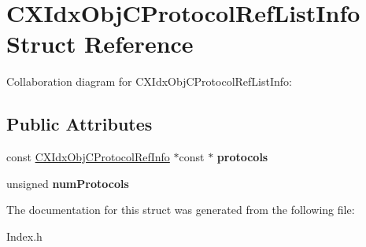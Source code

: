 \hypertarget{structCXIdxObjCProtocolRefListInfo}{}\section{C\+X\+Idx\+Obj\+C\+Protocol\+Ref\+List\+Info Struct Reference}
\label{structCXIdxObjCProtocolRefListInfo}


Collaboration diagram for C\+X\+Idx\+Obj\+C\+Protocol\+Ref\+List\+Info\+:
\subsection*{Public Attributes}
\begin{DoxyCompactItemize}
\item 
\mbox{\label{structCXIdxObjCProtocolRefListInfo_acb9f5514262e6520e041e0ce52ee3a42}} 
const \hyperlink{structCXIdxObjCProtocolRefInfo}{C\+X\+Idx\+Obj\+C\+Protocol\+Ref\+Info} $\ast$const  $\ast$ {\bfseries protocols}
\item 
\mbox{\label{structCXIdxObjCProtocolRefListInfo_a794c3a04408408651a8f8dd99cd2282b}} 
unsigned {\bfseries num\+Protocols}
\end{DoxyCompactItemize}


The documentation for this struct was generated from the following file\+:\begin{DoxyCompactItemize}
\item 
Index.\+h\end{DoxyCompactItemize}
